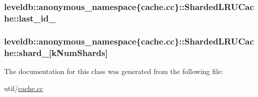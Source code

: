 \subsubsection[{last\+\_\+id\+\_\+}]{ leveldb\+::anonymous\+\_\+namespace\{cache.\+cc\}\+::Sharded\+L\+R\+U\+Cache\+::last\+\_\+id\+\_\+\hspace{0.3cm}{\ttfamily [private]}}\label{classleveldb_1_1anonymous__namespace_02cache_8cc_03_1_1_sharded_l_r_u_cache_aa3ce6feff0c78135bea246466410efe3}
\hypertarget{classleveldb_1_1anonymous__namespace_02cache_8cc_03_1_1_sharded_l_r_u_cache_af9dd0c7a6b50964fd1a4c23b6f7dcf50}{}
\subsubsection[{shard\+\_\+}]{ leveldb\+::anonymous\+\_\+namespace\{cache.\+cc\}\+::Sharded\+L\+R\+U\+Cache\+::shard\+\_\+\mbox{[}{\bf k\+Num\+Shards}\mbox{]}\hspace{0.3cm}{\ttfamily [private]}}\label{classleveldb_1_1anonymous__namespace_02cache_8cc_03_1_1_sharded_l_r_u_cache_af9dd0c7a6b50964fd1a4c23b6f7dcf50}


The documentation for this class was generated from the following file\+:\begin{DoxyCompactItemize}
\item 
util/\hyperlink{cache_8cc}{cache.\+cc}\end{DoxyCompactItemize}
